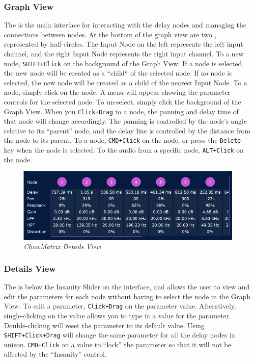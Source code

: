 \documentclass[landscape,twocolumn,a5paper]{manual}
\begin{document}
\subsubsection{Graph View}
The  is the main interface for interacting
with the delay nodes and managing the connections between nodes.
\newpar
At the bottom of the graph view are two ,
represented by half-circles. The Input Node on the left represents
the left input channel, and the right Input Node represents the right
input channel.
\newpar
To  a new node, \texttt{SHIFT+Click} on the
background of the Graph View. If a node is selected, the new
node will be created as a ``child`` of the selected node. If
no node is selected, the new node will be created as a child
of the nearest Input Node.
\newpar
To  a node, simply click on the node. A menu
will appear showing the parameter controls for the selected node.
To un-select, simply click the background of the Graph View.
\newpar
When you \texttt{Click+Drag} to  a node, the
panning and delay time of that node will change accordingly.
The panning is controlled by the node's angle relative to its
``parent'' node, and the delay line is controlled by the distance
from the node to its parent.
\newpar
To  a node, \texttt{CMD+Click} on the node,
or press the \texttt{Delete} key when the node is selected.
\newpar
To  the audio from a specific node,
\texttt{ALT+Click} on the node.

\begin{figure}[ht]
    \center
    \includegraphics[width=0.75\columnwidth]{screenshots/DetailsView.png}
    \caption{\label{fig:details_view}{\it ChowMatrix Details View}}
\end{figure}

\subsubsection{Details View}
The  is below the Insanity Slider
on the interface, and allows the user to view and edit the
parameters for each node without having to select the node
in the Graph View.
\newpar
To edit a parameter, \texttt{Click+Drag} on the parameter
value. Alteratively, single-clicking on the value allows
you to type in a value for the parameter. Double-clicking
will reset the parameter to its default value.
\newpar
Using \texttt{SHIFT+Click+Drag} will change the same parameter
for all the delay nodes in unison. \texttt{CMD+Click} on a value
to ``lock'' the parameter so that it will not be affected by the
``Insanity'' control.
\end{document}
